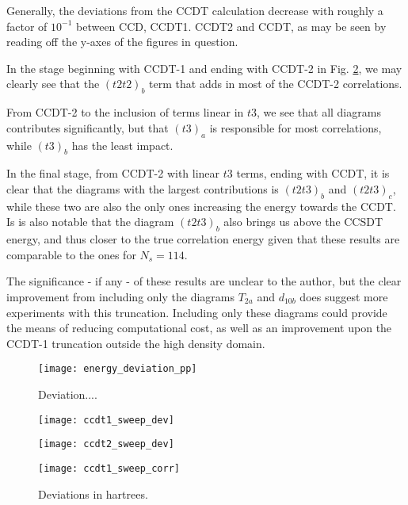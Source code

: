 Generally, the deviations from the CCDT calculation decrease with roughly a factor of $10^{-1}$ between CCD, CCDT1. CCDT2 and CCDT, as may be seen by reading off the y-axes of the figures in question. 

In the stage beginning with CCDT-1 and ending with CCDT-2 in Fig. \ref{fig:ccdt2_sweep_dev}, we may clearly see that the $(t2t2)_b$ term that adds in most of the CCDT-2 correlations.

From CCDT-2 to the inclusion of terms linear in $t3$, we see that all diagrams contributes significantly, but that $(t3)_a$ is responsible for most correlations, while $(t3)_b$ has the least impact.

In the final stage, from CCDT-2 with linear $t3$ terms, ending with CCDT, it is clear that the diagrams with the largest contributions is $(t2t3)_b$ and $(t2t3)_c$, while these two are also the only ones increasing the energy towards the CCDT. Is is also notable that the diagram $(t2t3)_b$ also brings us above the CCSDT energy, and thus closer to the true correlation energy given that these results are comparable to the ones for $N_s = 114$.

The significance - if any -  of these results are unclear to the author, but the clear improvement from including only the diagrams $T_{2a}$ and $d_{10b}$ does suggest more experiments with this truncation. Including only these diagrams could provide the means of reducing computational cost, as well as an improvement upon the CCDT-1 truncation outside the high density domain. 

\begin{figure}[p]
    \centering
    \texttt{[image: energy\_deviation\_pp]}
    \caption{Deviation....}
    \label{fig:energy_deviation_pp}
\end{figure}



\begin{figure}[!htb]
  \centering
  \texttt{[image: ccdt1\_sweep\_dev]}
  \caption{}\label{fig:ccdt1_sweep_dev}
\endminipage\hfill
{}
  \centering
  \texttt{[image: ccdt2\_sweep\_dev]}
  \caption{}\label{fig:ccdt2_sweep_dev}
\endminipage\hfill
{}
\endminipage\hfill
\end{figure}


\begin{figure}[!htb]
  \centering
  \texttt{[image: ccdt1\_sweep\_corr]}
  \caption{Deviations in hartrees.}
\label{fig:ccdt1_sweep_corr}
\end{figure}



